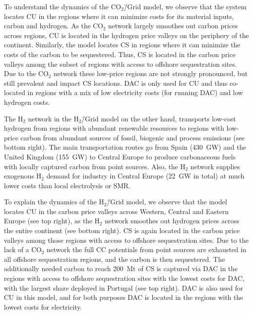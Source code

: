 \documentclass[twocolumn]{article}
\newcommand{\COtwo}{CO$_2$}
\newcommand{\Htwo}{H$_2$}
\newcommand{\modCO}{CO$_2$\=/Grid model}
\newcommand{\modH}{H$_2$\=/Grid model}
\begin{document}
To understand the dynamics of the \modCO{}, we observe that the system locates CU in the regions where it can minimize costs for its material inputs, carbon and hydrogen. As the \COtwo{} network largely smoothes out carbon prices across regions, CU is located in the hydrogen price valleys on the periphery of the continent. Similarly, the model locates CS in regions where it can minimize the costs of the carbon to be sequestered. Thus, CS is located in the carbon price valleys among the subset of regions with access to offshore sequestration sites. Due to the \COtwo{} network these low-price regions are not strongly pronounced, but still prevalent and impact CS locations. DAC is only used for CU and thus co-located in regions with a mix of low electricity costs (for running DAC) and low hydrogen costs.

The \Htwo{} network in the \modH{} on the other hand, transports low-cost hydrogen from regions with abundant renewable resources to regions with low-price carbon from abundant sources of fossil, biogenic and process emissions (see bottom right). The main transportation routes go from Spain (430~GW) and the United Kingdom (155~GW) to Central Europe to produce carbonaceous fuels with locally captured carbon from point sources. Also, the \Htwo{} network supplies exogenous \Htwo{} demand for industry in Central Europe (22~GW in total) at much lower costs than local electrolysis or SMR.

To explain the dynamics of the \modH{}, we observe that the model locates CU in the carbon price valleys across Western, Central and Eastern Europe (see top right), as the \Htwo{} network smoothes out hydrogen prices across the entire continent (see bottom right). CS is again located in the carbon price valleys among those regions with access to offshore sequestration sites. Due to the lack of a \COtwo{} network the full CC potentials from point sources are exhausted in all offshore sequestration regions, and the carbon is then sequestered. The additionally needed carbon to reach 200~Mt of CS is captured via DAC in the regions with access to offshore sequestration sites with the lowest costs for DAC, with the largest share deployed in Portugal (see top right). DAC is also used for CU in this model, and for both purposes DAC is located in the regions with the lowest costs for electricity.
\end{document}
